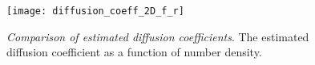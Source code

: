 \documentclass[12pt]{article}
\begin{document}
\begin{figure}[h!]
	\centering
    \texttt{[image: diffusion\_coeff\_2D\_f\_r]}
	\caption{\textit{Comparison of estimated diffusion coefficients}. The estimated diffusion coefficient as a function of number density.}
	\label{fig:msd}
\end{figure}

\clearpage
\printbibliography
\end{document}
